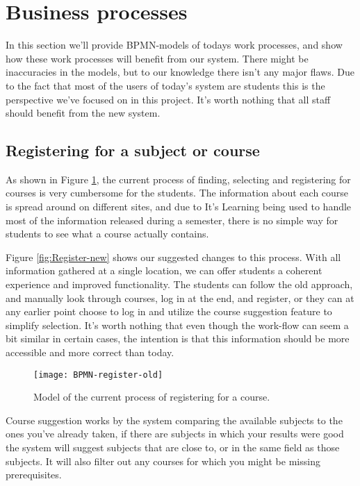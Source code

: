 \section{Business processes}
	In this section we'll provide BPMN-models \cite{bpmn} of todays work processes, and show how these work processes will benefit from our system. There might be inaccuracies in 
    the models, but to our knowledge there isn't any major flaws. Due to the fact that most of the users of today's system are students this is the perspective we've focused on in this project. It's worth nothing that all staff should benefit from the new system.

\subsection{Registering for a subject or course}
	As shown in Figure \ref{fig:Register-old}, the current process of finding, selecting and registering for courses is very cumbersome for the students.
The information about each course is spread around on different sites, and due to It's Learning being used to handle most of the information released during a semester,
there is no simple way for students to see what a course actually contains.

Figure \ref{fig:Register-new} shows our suggested changes to this process.
With all information gathered at a single location, we can offer students a coherent experience and improved functionality.
The students can follow the old approach, and manually look through courses, log in at the end, and register,
or they can at any earlier point choose to log in and utilize the course suggestion feature to simplify selection. It's worth nothing that even though the work-flow can seem a bit similar in certain cases, the intention is that this information should be more accessible and more correct than today.\\ 
\begin{figure}[H]
    \centering
    \texttt{[image: BPMN-register-old]}%
    \caption{Model of the current process of registering for a course.}
    \label{fig:Register-old}
\end{figure}
\noindent
Course suggestion works by the system comparing the available subjects to the ones you've already taken, if there are subjects in which your results were good the system will
suggest subjects that are close to, or in the same field as those subjects. It will also filter out any courses for which you might be missing prerequisites.\\

